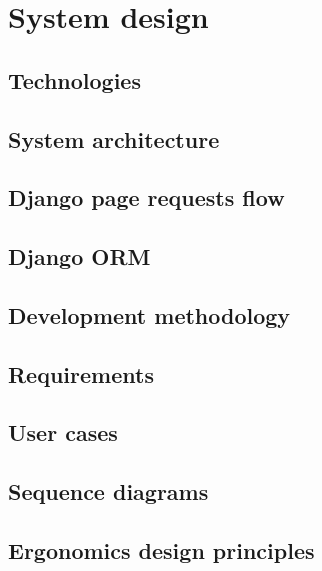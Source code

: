 \chapter{System design}

\section{Technologies}

\section{System architecture}

\section{Django page requests flow}

\section{Django ORM}

\section{Development methodology}

\section{Requirements}

\section{User cases}

\section{Sequence diagrams}

\section{Ergonomics design principles}